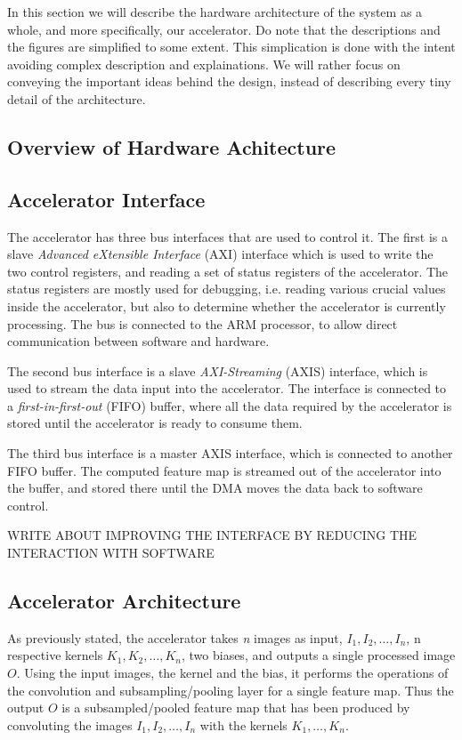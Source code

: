 In this section we will describe the hardware architecture of the system as a whole, and more specifically, our accelerator. Do note that the descriptions and the figures are simplified to some extent. This simplication is done with the intent avoiding complex description and explainations. We will rather focus on conveying the important ideas behind the design, instead of describing every tiny detail of the architecture. 

\subsection{Overview of Hardware Achitecture}


\subsection{Accelerator Interface}

The accelerator has three bus interfaces that are used to control it. The first is a slave \textit{Advanced eXtensible Interface} (AXI) interface which is used to write the two control registers, and reading a set of status registers of the accelerator. The status registers are mostly used for debugging, i.e. reading various crucial values inside the accelerator, but also to determine whether the accelerator is currently processing. The bus is connected to the ARM processor, to allow direct communication between software and hardware.

The second bus interface is a slave \textit{AXI-Streaming} (AXIS) interface, which is used to stream the data input into the accelerator. The interface is connected to a \textit{first-in-first-out} (FIFO) buffer, where all the data required by the accelerator is stored until the accelerator is ready to consume them. 

The third bus interface is a master AXIS interface, which is connected to another FIFO buffer. The computed feature map is streamed out of the accelerator into the buffer, and stored there until the DMA  moves the data back to software control.

 WRITE ABOUT IMPROVING THE INTERFACE BY REDUCING THE INTERACTION WITH SOFTWARE



\subsection{Accelerator Architecture}

As previously stated, the accelerator takes \textit{n} images as input, $ I_1, I_2, \dots, I_n $, n respective kernels $ K_1, K_2, \dots, K_n $, two biases, and outputs a single processed image $ O $. Using the input images, the kernel and the bias, it performs the operations of the convolution and subsampling/pooling layer for a single feature map. Thus the output $ O $ is a subsampled/pooled feature map that has been produced by convoluting the images $ I_1, I_2, \dots, I_n $ with the kernels $ K_1, \dots, K_n $. 

